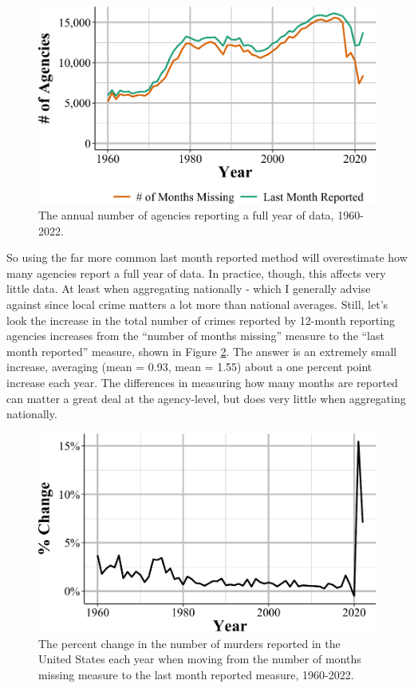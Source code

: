\documentclass[
  12pt,
  openany]{book}
\begin{document}
\begin{figure}

{\centering \includegraphics[width=0.9\linewidth]{03_offenses_known_files/figure-latex/offensesAgenciesReportingFull-1} 

}

\caption{The annual number of agencies reporting a full year of data, 1960-2022.}\label{fig:offensesAgenciesReportingFull}
\end{figure}

So using the far more common last month reported method will overestimate how many agencies report a full year of data. In practice, though, this affects very little data. At least when aggregating nationally - which I generally advise against since local crime matters a lot more than national averages. Still, let's look the increase in the total number of crimes reported by 12-month reporting agencies increases from the ``number of months missing'' measure to the ``last month reported'' measure, shown in Figure \ref{fig:murdersBothMeasures}. The answer is an extremely small increase, averaging (mean = 0.93, mean = 1.55) about a one percent point increase each year. The differences in measuring how many months are reported can matter a great deal at the agency-level, but does very little when aggregating nationally.

\begin{figure}

{\centering \includegraphics[width=0.9\linewidth]{03_offenses_known_files/figure-latex/murdersBothMeasures-1} 

}

\caption{The percent change in the number of murders reported in the United States each year when moving from the number of months missing measure to the last month reported measure, 1960-2022.}\label{fig:murdersBothMeasures}
\end{figure}
\end{document}
